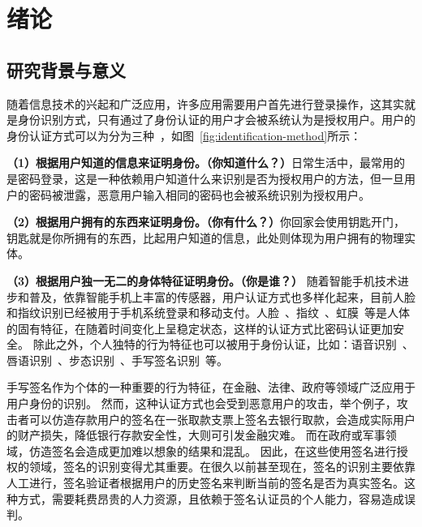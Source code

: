 

\chapter{绪论}
\label{chap:intro}
\section{研究背景与意义}
随着信息技术的兴起和广泛应用，许多应用需要用户首先进行登录操作，这其实就是身份识别方式，只有通过了身份认证的用户才会被系统认为是授权用户。用户的身份认证方式可以为分为三种~\cite{Huang2011A}，如图~\ref{fig:identification-method}所示：

\textbf{（1）根据用户知道的信息来证明身份。（你知道什么？）}日常生活中，最常用的是密码登录，这是一种依赖用户知道什么来识别是否为授权用户的方法，但一旦用户的密码被泄露，恶意用户输入相同的密码也会被系统识别为授权用户。

\textbf{（2）根据用户拥有的东西来证明身份。（你有什么？）}你回家会使用钥匙开门，钥匙就是你所拥有的东西，比起用户知道的信息，此处则体现为用户拥有的物理实体。

\textbf{（3）根据用户独一无二的身体特征证明身份。（你是谁？）} 随着智能手机技术进步和普及，依靠智能手机上丰富的传感器，用户认证方式也多样化起来，目前人脸和指纹识别已经被用于手机系统登录和移动支付。人脸~\cite{12717}、指纹~\cite{Andrew2005Handbook}、虹膜~\cite{Wildes1997Iris}等是人体的固有特征，在随着时间变化上呈稳定状态，这样的认证方式比密码认证更加安全。 除此之外，个人独特的行为特征也可以被用于身份认证，比如：语音识别~\cite{Rashid2008Security}、唇语识别~\cite{Cetingul2006Discriminative}、步态识别~\cite{Boulgouris2005Gait}、手写签名识别~\cite{Plamondona1989Automatic}等。 


手写签名作为个体的一种重要的行为特征，在金融、法律、政府等领域广泛应用于用户身份的识别。 然而，这种认证方式也会受到恶意用户的攻击，举个例子，攻击者可以仿造存款用户的签名在一张取款支票上签名去银行取款，会造成实际用户的财产损失，降低银行存款安全性，大则可引发金融灾难。 而在政府或军事领域，仿造签名会造成更加难以想象的结果和混乱。 因此，在这些使用签名进行授权的领域，签名的识别变得尤其重要。在很久以前甚至现在，签名的识别主要依靠人工进行，签名验证者根据用户的历史签名来判断当前的签名是否为真实签名。这种方式，需要耗费昂贵的人力资源，且依赖于签名认证员的个人能力，容易造成误判。

